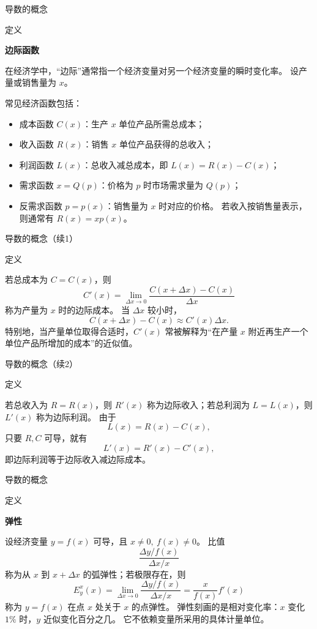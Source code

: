 \documentclass[aspectratio=169,10pt,fontset=fandol]{ctexbeamer}
\begin{document}
\begin{frame}[t,fragile]{导数的概念}
\footnotesize
\begin{block}{定义}
{\footnotesize
\textbf{边际函数}\par

在经济学中，“边际”通常指一个经济变量对另一个经济变量的瞬时变化率。 设产量或销售量为 $x$。

常见经济函数包括：
\begin{itemize}
\item 成本函数 $C(x)$：生产 $x$ 单位产品所需总成本；
\item 收入函数 $R(x)$：销售 $x$ 单位产品获得的总收入；
\item 利润函数 $L(x)$：总收入减总成本，即 $L(x)=R(x)-C(x)$；
\item 需求函数 $x=Q(p)$：价格为 $p$ 时市场需求量为 $Q(p)$；
\item 反需求函数 $p=p(x)$：销售量为 $x$ 时对应的价格。 若收入按销售量表示，则通常有 $R(x)=xp(x)$。
\end{itemize}
}
\end{block}
\end{frame}
\begin{frame}[t,fragile]{导数的概念（续1）}
\footnotesize
\begin{block}{定义}
{\footnotesize


若总成本为 $C=C(x)$，则
\[
C'(x)=\lim_{\Delta x\to0}\frac{C(x+\Delta x)-C(x)}{\Delta x}
\]
称为产量为 $x$ 时的边际成本。 当 $\Delta x$ 较小时，
\[
C(x+\Delta x)-C(x)\approx C'(x)\Delta x.
\]
特别地，当产量单位取得合适时，$C'(x)$ 常被解释为“在产量 $x$ 附近再生产一个单位产品所增加的成本”的近似值。


}
\end{block}
\end{frame}
\begin{frame}[t,fragile]{导数的概念（续2）}
\footnotesize
\begin{block}{定义}
{\footnotesize
若总收入为 $R=R(x)$，则 $R'(x)$ 称为边际收入；若总利润为 $L=L(x)$，则 $L'(x)$ 称为边际利润。 由于
\[
L(x)=R(x)-C(x),
\]
只要 $R,C$ 可导，就有
\[
L'(x)=R'(x)-C'(x),
\]
即边际利润等于边际收入减边际成本。

}
\end{block}
\end{frame}
\begin{frame}[t,fragile]{导数的概念}
\footnotesize
\begin{block}{定义}
{\footnotesize
\textbf{弹性}\par

设经济变量 $y=f(x)$ 可导，且 $x\neq0,\ f(x)\neq0$。 比值
\[
\frac{\Delta y/f(x)}{\Delta x/x}
\]
称为从 $x$ 到 $x+\Delta x$ 的弧弹性；若极限存在，则
\[
E_y^x(x)=\lim_{\Delta x\to0}\frac{\Delta y/f(x)}{\Delta x/x}
=\frac{x}{f(x)}f'(x)
\]
称为 $y=f(x)$ 在点 $x$ 处关于 $x$ 的点弹性。 弹性刻画的是相对变化率：$x$ 变化 $1\%$ 时，$y$ 近似变化百分之几。 它不依赖变量所采用的具体计量单位。

}
\end{block}
\end{frame}
\end{document}
